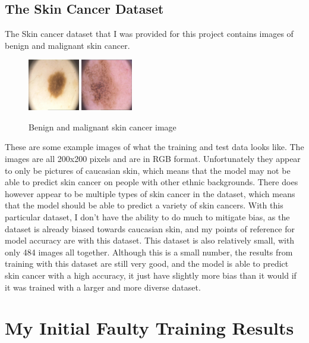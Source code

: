 \documentclass[]{final_report}
\begin{document}
\clearpage
\section{The Skin Cancer Dataset}
The Skin cancer dataset that I was provided for this project contains images of benign and malignant skin cancer.

\begin{figure}[h]
  \centering
  \includegraphics[width=0.2\textwidth]{images/benign-skin-cancer.png}
  \includegraphics[width=0.2\textwidth]{images/malignant-skin-cancer.png}
  \caption{Benign and malignant skin cancer image}
  \label{fig:benign-malignant}
\end{figure}

These are some example images of what the training and test data looks like. The images are all 200x200 pixels and are in RGB format.
Unfortunately they appear to only be pictures of caucasian skin, which means that the model may not be able to predict skin cancer on people with other ethnic backgrounds.
There does however appear to be multiple types of skin cancer in the dataset, which means that the model should be able to predict a variety of skin cancers.
With this particular dataset, I don't have the ability to do much to mitigate bias, as the dataset is already biased towards caucasian skin, and my points of reference for model accuracy are with this dataset.
This dataset is also relatively small, with only 484 images all together. Although this is a small number, the results from training with this dataset are still very good, and the model is able to predict skin cancer with a high accuracy, it just have slightly more bias than it would if it was trained with a larger and more diverse dataset.

\chapter{My Initial Faulty Training Results}
\end{document}

